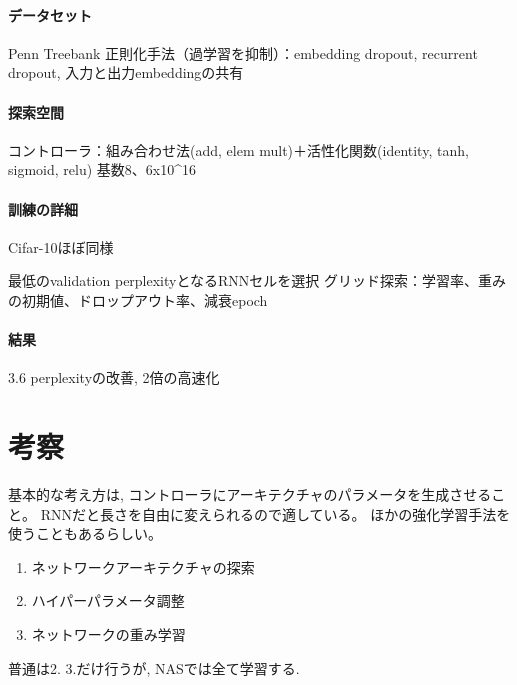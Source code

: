 \documentclass[twocolumn]{jarticle}     %
\begin{document}
\paragraph{データセット}
Penn Treebank
正則化手法（過学習を抑制）：embedding dropout, recurrent dropout, 入力と出力embeddingの共有

\paragraph{探索空間}
コントローラ：組み合わせ法(add, elem mult)＋活性化関数(identity, tanh, sigmoid, relu)
基数8、6x10^16

\paragraph{訓練の詳細}
Cifar-10ほぼ同様

最低のvalidation perplexityとなるRNNセルを選択
グリッド探索：学習率、重みの初期値、ドロップアウト率、減衰epoch

\paragraph{結果}
3.6 perplexityの改善, 2倍の高速化\\

%

\section{考察}
基本的な考え方は, コントローラにアーキテクチャのパラメータを生成させること。
RNNだと長さを自由に変えられるので適している。
ほかの強化学習手法を使うこともあるらしい。
\begin{enumerate}
  \item ネットワークアーキテクチャの探索
  \item ハイパーパラメータ調整
  \item ネットワークの重み学習
\end{enumerate}
普通は2. 3.だけ行うが, NASでは全て学習する.
\end{document}
